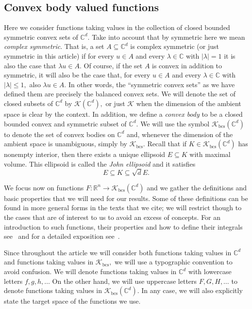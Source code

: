 \documentclass{article}
\theoremstyle{definition}
\theoremstyle{remark}
\numberwithin{equation}{section}
\newcommand{\cK}{\mathcal{K}}
\newcommand{\reals}{\mathbb{R}}
\newcommand{\complex}{\mathbb{C}}
\newcommand{\convex}{\cK_{\mathrm{bcs}}}
\newcommand{\1}{\mathbf{1}}
\begin{document}
    \subsection{Convex body valued functions}
    \label{sec:ConvexBodyValuedFunctions}
    Here we consider functions taking values in the collection of closed bounded symmetric convex sets of $\complex^d.$
    Take into account that by symmetric here we mean \emph{complex symmetric}.
    That is, a set $A \subseteq \complex^d$ is complex symmetric (or just symmetric in this article) if
    for every $u \in A$ and every $\lambda \in \complex$ with $|\lambda| = 1$ it is also the case that $\lambda u \in A.$
    Of course, if the set $A$ is convex in addition to symmetric, it will also be the case that,
    for every $u \in A$ and every $\lambda \in \complex$ with $|\lambda| \leq 1,$ also $\lambda u \in A.$ In other words, the ``symmetric convex sets'' as we have defined them are precisely the balanced convex sets.
    We will denote the set of closed subsets of $\complex^d$ by $\cK(\complex^d),$
    or just $\cK$ when the dimension of the ambient space is clear by the context.
    In addition, we define a \emph{convex body} to be a closed bounded convex and symmetric subset of $\complex^d.$
    We will use the symbol $\convex(\complex^d)$ to denote the set of convex bodies on $\complex^d$
    and, whenever the dimension of the ambient space is unambiguous, simply by $\convex.$
    Recall that if $K \in \convex(\complex^d)$ has nonempty interior,
    then there exists a unique ellipsoid $E \subseteq K$ with maximal volume.
    This ellipsoid is called the \emph{John ellipsoid} and it satisfies
    \begin{equation*}
        E \subseteq K \subseteq \sqrt{d} E.
    \end{equation*}
    
    We focus now on functions $F\colon \reals^n \rightarrow \convex(\complex^d)$
    and we gather the definitions and basic properties that we will need for our results.
    Some of these definitions can be found in more general forms in the texts that we cite;
    we will restrict though to the cases that are of interest to us to avoid an excess of concepts.
    For an introduction to such functions, their properties and how to define their integrals
    see~\cite{Cruz_Uribe_Bownik_Extrapolation, Cruz_Uribe_Extrapolation} and
    for a detailed exposition see~\cite{Aubin_2009}.

    Since throughout the article we will consider both functions taking values in $\complex^d$
    and functions taking values in $\convex,$
    we will use a typographic convention to avoid confusion.
    We will denote functions taking values in $\complex^d$ with lowercase letters $f,g,h,\ldots$
    On the other hand, we will use uppercase letters $F,G,H,\ldots$ to denote functions taking values in $\convex(\complex^d).$
    In any case, we will also explicitly state the target space of the functions we use.
\end{document}
